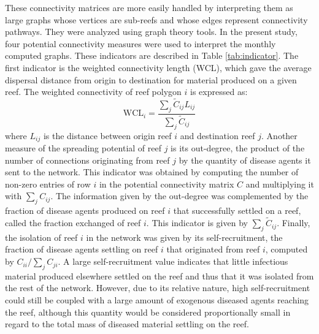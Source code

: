 These connectivity matrices are more easily handled by interpreting them as large graphs whose vertices are sub-reefs and whose edges represent connectivity pathways. They were analyzed using graph theory tools. In the present study, four potential connectivity measures were used to interpret the monthly computed graphs. These indicators are described in Table \ref{tab:indicator}. The first indicator is the weighted connectivity length (WCL), which gave the average dispersal distance from origin to destination for material produced on a given reef. The weighted connectivity of reef polygon $i$ is expressed as:
\begin{equation}
    \textrm{WCL}_i = \dfrac{\sum_j \tilde{C}_{ij} L_{ij}}{\sum_j \tilde{C}_{ij}}
\end{equation}
where $L_{ij}$ is the distance between origin reef $i$ and destination reef $j$. Another measure of the spreading potential of reef $j$ is its out-degree, \ie the product of the number of connections originating from reef $j$ by the quantity of disease agents it sent to the network. This indicator was obtained by computing the number of non-zero entries of row $i$ in the potential connectivity matrix $C$ and multiplying it with $\sum_j C_{ij}$. The information given by the out-degree was complemented by the fraction of disease agents produced on reef $i$ that successfully settled on a reef, called the fraction exchanged of reef $i$. This indicator is given by $\sum_{j} \tilde{C}_{ij}$. Finally, the isolation of reef $i$ in the network was given by its self-recruitment, \ie the fraction of disease agents settling on reef $i$ that originated from reef $i$, computed by $C_{ii}/\sum_jC_{ji}$. A large self-recruitment value indicates that little infectious material produced elsewhere settled on the reef and thus that it was isolated from the rest of the network. However, due to its relative nature, high self-recruitment could still be coupled with a large amount of exogenous diseased agents reaching the reef, although this quantity would be considered proportionally small in regard to the total mass of diseased material settling on the reef.

